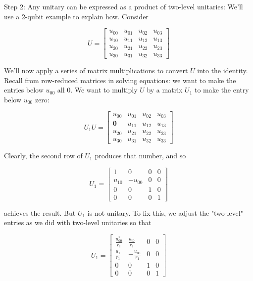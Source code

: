 \documentclass[main.tex]{subfiles}
\begin{document}
    Step 2: Any unitary can be expressed as a product of two-level unitaries: We'll use a 2-qubit example to explain how. Consider
    
    $$
    U=\left[\begin{array}{llll}
    u_{00} & u_{01} & u_{02} & u_{03} \\
    u_{10} & u_{11} & u_{12} & u_{13} \\
    u_{20} & u_{21} & u_{22} & u_{23} \\
    u_{30} & u_{31} & u_{32} & u_{33}
    \end{array}\right]
    $$
    
    We'll now apply a series of matrix multiplications to convert $U$ into the identity. Recall from row-reduced matrices in solving equations: we want to make the entries below $u_{00}$ all 0. We want to multiply $U$ by a matrix $U_{1}$ to make the entry below $u_{00}$ zero:
    
    $$
    U_{1} U=\left[\begin{array}{cccc}
    u_{00} & u_{01} & u_{02} & u_{03} \\
    \mathbf{0} & u_{11} & u_{12} & u_{13} \\
    u_{20} & u_{21} & u_{22} & u_{23} \\
    u_{30} & u_{31} & u_{32} & u_{33}
    \end{array}\right]
    $$
    
    Clearly, the second row of $U_{1}$ produces that number, and so
    
    $$
    U_{1}=\left[\begin{array}{cccc}
    1 & 0 & 0 & 0 \\
    u_{10} & -u_{00} & 0 & 0 \\
    0 & 0 & 1 & 0 \\
    0 & 0 & 0 & 1
    \end{array}\right]
    $$
    
    achieves the result. But $U_{1}$ is not unitary. To fix this, we adjust the "two-level" entries as we did with two-level unitaries so that
    
    $$
    U_{1}=\left[\begin{array}{cccc}
    \frac{u_{00}^{*}}{r_{1}} & \frac{u_{i 0}}{r_{1}} & 0 & 0 \\
    \frac{u_{1}}{r_{1}} & -\frac{u_{00}}{r_{1}} & 0 & 0 \\
    0 & 0 & 1 & 0 \\
    0 & 0 & 0 & 1
    \end{array}\right]
    $$
    
\end{document}
